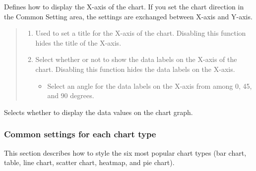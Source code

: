 \documentclass[letterpaper,10pt,english]{sphinxmanual}
\begin{document}
Defines how to display the X-axis of the chart. If you set the chart direction  in the Common Setting area, the settings are exchanged between X-axis and Y-axis.
\begin{quote}

\begin{figure}[H]
\centering

\noindent{}
\end{figure}
\begin{enumerate}
\def\theenumi{\arabic{enumi}}
\def\labelenumi{\theenumi .}
\makeatletter\def\p@enumii{\p@enumi \theenumi .}\makeatother
\item {} 
 Used to set a title for the X-axis of the chart. Disabling this function hides the title of the X-axis.

\item {} 
 Select whether or not to show the data labels on the X-axis of the chart. Disabling this function hides the data labels on the X-axis.
\begin{itemize}
\item {} 
 Select an angle for the data labels on the X-axis from among 0, 45, and 90 degrees.

\end{itemize}

\end{enumerate}
\end{quote}


Selects whether to display the data values on the chart graph.
\begin{quote}

\begin{figure}[H]
\centering

\noindent{}
\end{figure}
\end{quote}


\subsubsection{Common settings for each chart type}
\label{\detokenize{discovery/part04/chart_style:id3}}
This section describes how to style the six most popular chart types (bar chart, table, line chart, scatter chart, heatmap, and pie chart).
\begin{quote}

\begin{figure}[H]
\centering

\noindent{}
\end{figure}
\end{quote}
\end{document}
